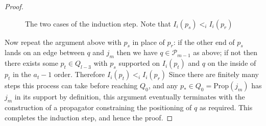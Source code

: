\documentclass[11pt]{article}
\newcommand{\hlfix}[2]{\texthl{#1}\todo{#2}}
\newcommand{\newnode}[3][left]{
	\node[label={[label distance=-1mm]#1:{\scriptsize $#3$}}] at (\zero + #2*\step:\radius) {\scriptsize $\bullet$};
}
\newcommand{\cP}{\mathcal{P}}
\newcommand{\Prop}{\textrm{Prop}}
\theoremstyle{remark}
\theoremstyle{definition}
\begin{document}
\begin{proof}
\begin{figure}[h]
{ }\eas
\caption{The two cases of the induction step. Note that $I_i(p_s) <_i I_i(p_r)$}\label{fig:awkward induction step}
\end{figure}
Now repeat the argument above with $p_s$ in place of $p_r$: if the other end of $p_s$ lands on an edge between $q$ and $j_m$ then we have $q \in \cP_{m-1}$ as above; if not then there exists some $p_t \in Q_{l-3}$ with $p_s$ supported on $I_i(p_t)$ and $q$ on the inside of $p_t$ in the $a_t-1$ order. Therefore $I_i(p_t) <_i I_i(p_r)$
Since there are finitely many steps this process can take before reaching $Q_0$, and any $p_* \in Q_0  = \Prop(j_m)$ has $j_m$ in its support by definition, this argument eventually terminates with the construction of a propagator constraining the positioning of $q$ as required. This completes the induction step, and hence the proof.\end{proof}
\end{document}
